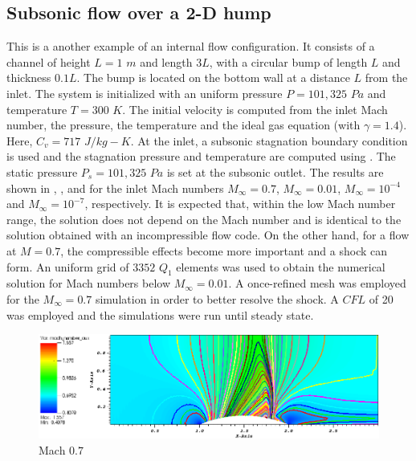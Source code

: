 \subsection{Subsonic flow over a 2-D hump} \label{sec:hump}
This is a another example of an internal flow configuration. It consists of a channel of height $L=1$ $m$ and length $3L$, with a circular bump of length $L$ and thickness $0.1L$. The bump is located on the bottom wall at a distance $L$ from the inlet. The system is initialized with an uniform pressure $P=101,325$ $Pa$ and temperature $T=300$ $K$. The initial velocity is computed from the inlet Mach number, the pressure, the temperature and the ideal gas equation (with  $\gamma=1.4$). Here,  $C_v = 717$ $J/kg-K$. At the inlet, a subsonic stagnation boundary condition is used and the stagnation pressure and temperature are computed using .
The static pressure $P_s = 101,325$ $Pa$ is set at the subsonic outlet. The results are shown in , ,  and  for the inlet Mach numbers $M_{\infty}=0.7$, $M_{\infty}=0.01$, $M_{\infty}=10^{-4}$ and $M_{\infty}=10^{-7}$, respectively. It is expected that, within the low Mach number range, the solution does not depend on the Mach number and is identical to the solution obtained with an incompressible flow code. On the other hand, for a flow at $M=0.7$, the compressible effects become more important and a shock can form. An uniform grid of $3352$ $Q_1$ elements was used to obtain the numerical solution for Mach numbers below $M_{\infty}=0.01$. A once-refined mesh was employed for the $M_{\infty}=0.7$ simulation in order to better resolve the shock. A $CFL$ of 20 was employed and the simulations were run until steady state.
%
        \begin{figure}[H]
                \centering
                \includegraphics[width=\textwidth]{figures/Hump2D_mach_0p7.png}
                \caption{Mach $0.7$}
                \label{fig:2d_hump_mach_0p7}
        \end{figure}%

